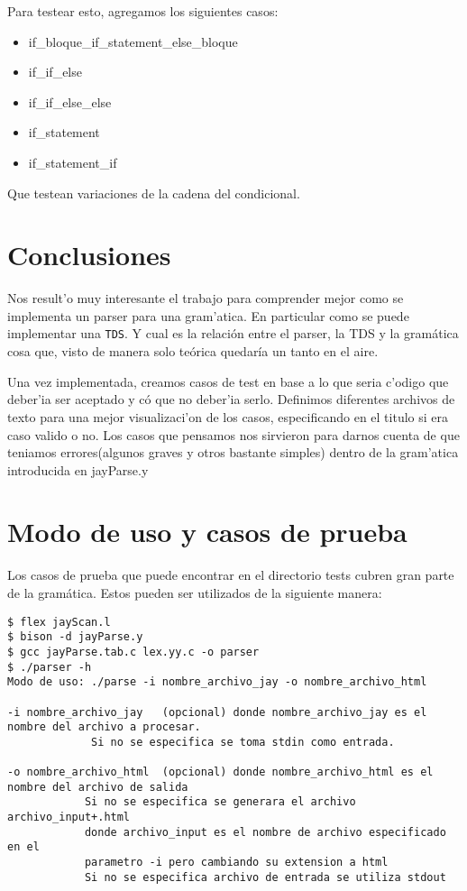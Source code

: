 \documentclass[a4paper,spanish]{article}
\begin{document}
Para testear esto, agregamos los siguientes casos:
\begin{itemize}
	\item if\_bloque\_if\_statement\_else\_bloque
	\item if\_if\_else
	\item if\_if\_else\_else
	\item if\_statement
	\item if\_statement\_if
\end{itemize}
Que testean variaciones de la cadena del condicional.



\section{Conclusiones}
Nos result'o muy interesante el trabajo para comprender mejor como se implementa un parser para una gram'atica. En particular como se puede implementar una \texttt{TDS}.
Y cual es la relaci\'on entre el parser, la TDS y la gram\'atica cosa que, visto de manera solo te\'orica quedar\'ia un tanto en el aire.

Una vez implementada, creamos casos de test en base a lo que seria c'odigo que deber'ia ser aceptado y c\'o que no deber'ia serlo. Definimos diferentes archivos de texto para una mejor visualizaci'on de los casos, especificando en el titulo si era caso valido o no. Los casos que pensamos nos sirvieron para darnos cuenta de que teniamos errores(algunos graves y otros bastante simples) dentro de la gram'atica introducida en jayParse.y


\section{Modo de uso y casos de prueba}

Los casos de prueba que puede encontrar en el directorio tests cubren gran parte de la gram\'atica. Estos pueden ser utilizados de la siguiente manera:
\begin{verbatim}
$ flex jayScan.l 
$ bison -d jayParse.y 
$ gcc jayParse.tab.c lex.yy.c -o parser
$ ./parser -h
Modo de uso: ./parse -i nombre_archivo_jay -o nombre_archivo_html

-i nombre_archivo_jay	(opcional) donde nombre_archivo_jay es el nombre del archivo a procesar.
			 Si no se especifica se toma stdin como entrada.

-o nombre_archivo_html	(opcional) donde nombre_archivo_html es el nombre del archivo de salida
			Si no se especifica se generara el archivo archivo_input+.html
			donde archivo_input es el nombre de archivo especificado en el
			parametro -i pero cambiando su extension a html
			Si no se especifica archivo de entrada se utiliza stdout

\end{verbatim}
\end{document}
